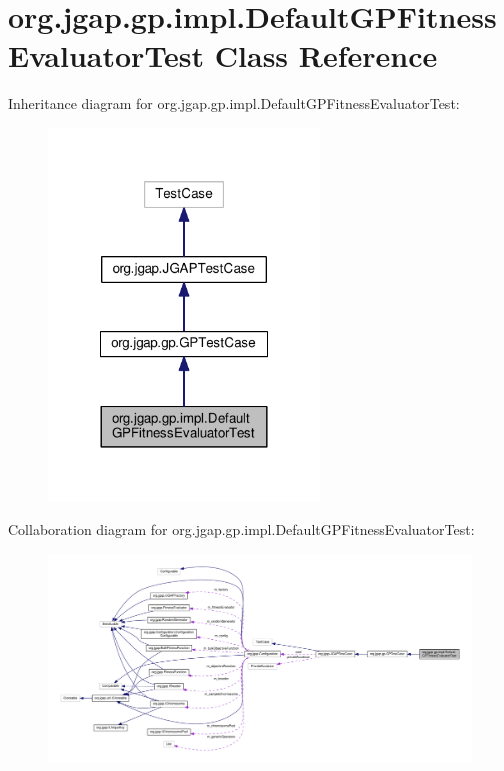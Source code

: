 \hypertarget{classorg_1_1jgap_1_1gp_1_1impl_1_1_default_g_p_fitness_evaluator_test}{\section{org.\-jgap.\-gp.\-impl.\-Default\-G\-P\-Fitness\-Evaluator\-Test Class Reference}
\label{classorg_1_1jgap_1_1gp_1_1impl_1_1_default_g_p_fitness_evaluator_test}
}


Inheritance diagram for org.\-jgap.\-gp.\-impl.\-Default\-G\-P\-Fitness\-Evaluator\-Test\-:
\nopagebreak
\begin{figure}[H]
\begin{center}
\leavevmode
\includegraphics[width=204pt]{classorg_1_1jgap_1_1gp_1_1impl_1_1_default_g_p_fitness_evaluator_test__inherit__graph}
\end{center}
\end{figure}


Collaboration diagram for org.\-jgap.\-gp.\-impl.\-Default\-G\-P\-Fitness\-Evaluator\-Test\-:
\nopagebreak
\begin{figure}[H]
\begin{center}
\leavevmode
\includegraphics[width=350pt]{classorg_1_1jgap_1_1gp_1_1impl_1_1_default_g_p_fitness_evaluator_test__coll__graph}
\end{center}
\end{figure}
